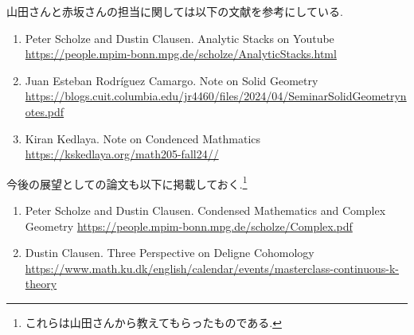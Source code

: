 \documentclass[dvipdfmx,a4paper,11pt]{report}
\theoremstyle{definition}
\begin{document}
山田さんと赤坂さんの担当に関しては以下の文献を参考にしている.
\begin{enumerate}
\item \cite{CS24} Peter Scholze and Dustin Clausen. Analytic Stacks on Youtube \url{https://people.mpim-bonn.mpg.de/scholze/AnalyticStacks.html}
\item \cite{Cam24} Juan Esteban Rodríguez Camargo. Note on Solid Geometry \url{https://blogs.cuit.columbia.edu/jr4460/files/2024/04/SeminarSolidGeometrynotes.pdf}
\item \cite{Ked25} Kiran Kedlaya. Note on Condenced Mathmatics \url{https://kskedlaya.org/math205-fall24//}
\end{enumerate}

今後の展望としての論文も以下に掲載しておく.\footnote{これらは山田さんから教えてもらったものである.}

\begin{enumerate}
\item \cite{CS22} Peter Scholze and Dustin Clausen. Condensed Mathematics and Complex Geometry \url{https://people.mpim-bonn.mpg.de/scholze/Complex.pdf}
\item \cite{Cla24} Dustin Clausen. Three  Perspective on Deligne Cohomology \url{https://www.math.ku.dk/english/calendar/events/masterclass-continuous-k-theory}
\end{enumerate}

\begin{comment}

圏論の基礎に関しては次の文献を参考にした.
\begin{enumerate}
\item \cite{Mac} S. マックレーン 圏論の基礎 丸善出版
\item \cite{alg}
alg-d 全ての概念はKan拡張である
\url{https://alg-d.com/math/kan_extension/} \\
Amazonで本が売っている. 
\end{enumerate}
個人的にはトポスを先に勉強しておけばよかったと後悔している.(\cite{Stum}や\cite{Bar22}はトポスの一般論も網羅している印象である.)

基数などに関しては以下を参考にした. 
\begin{enumerate}
\item \cite{Tana}
田中尚夫 公理的集合論　培風館
\item \cite{Sha2}
Shane Kelly
\textit{Fast track guide to cardinals for use with Lurie’s Higher Topos Theory}
\url{https://www.ms.u-tokyo.ac.jp/~kelly/pdfs/cardinalsFastTrack.pdf}
\end{enumerate}

\end{comment}
\end{document}
